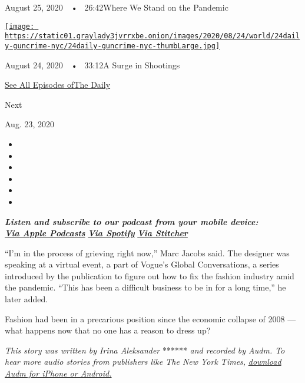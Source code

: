 August 25, 2020~~•~ 26:42Where We Stand on the Pandemic

\href{https://www.nytimes3xbfgragh.onion/2020/08/24/podcasts/the-daily/gun-violence-new-york.html?action=click\&module=audio-series-bar\&region=header\&pgtype=Article}{\texttt{[image: https://static01.graylady3jvrrxbe.onion/images/2020/08/24/world/24daily-guncrime-nyc/24daily-guncrime-nyc-thumbLarge.jpg]}}

August 24, 2020~~•~ 33:12A Surge in Shootings

\href{https://www.nytimes3xbfgragh.onion/column/the-daily}{See All
Episodes ofThe Daily}

Next

Aug. 23, 2020

\begin{itemize}
\item
\item
\item
\item
\item
\item
\end{itemize}

\emph{\textbf{Listen and subscribe to our podcast from your mobile
device:}}\\
\textbf{\href{https://itunes.apple.com/us/podcast/the-daily/id1200361736?mt=2}{\emph{Via
Apple Podcasts}}} \emph{\textbf{\textbar{}}}
\textbf{\href{https://open.spotify.com/show/3IM0lmZxpFAY7CwMuv9H4g?si=SfuMSC55R1qprFsRZU3_zw}{\emph{Via
Spotify}}} \emph{\textbf{\textbar{}}}
\textbf{\href{http://www.stitcher.com/podcast/the-new-york-times/the-daily-10}{\emph{Via
Stitcher}}}

``I'm in the process of grieving right now,'' Marc Jacobs said. The
designer was speaking at a virtual event, a part of Vogue's Global
Conversations, a series introduced by the publication to figure out how
to fix the fashion industry amid the pandemic. ``This has been a
difficult business to be in for a long time,'' he later added.

Fashion had been in a precarious position since the economic collapse of
2008 --- what happens now that no one has a reason to dress up?

\emph{This story was written by Irina Aleksander} ****** \emph{and
recorded by Audm. To hear more audio stories from publishers like The
New York Times,}
\href{https://www.audm.com/?utm_source=nytmag\&utm_medium=embed\&utm_campaign=sweatpants_forever_aleksander}{\emph{download
Audm for iPhone or Android.}}


